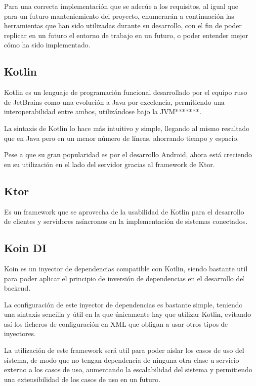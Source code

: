 Para una correcta implementación que se adecúe a los requisitos, al igual que para un futuro manteniemiento del proyecto, enumerarán a continuación las herramientas que han sido utilizadas durante su desarrollo, con el fin de poder replicar en un futuro el entorno de trabajo en un futuro, o poder entender mejor cómo ha sido implementado.

    \subsection{Kotlin}

Kotlin es un lenguaje de programación funcional desarrollado por el equipo ruso de JetBrains como una evolución a Java por excelencia, permitiendo una interoperabilidad entre ambos, utilizándose bajo la JVM*******.

La sintaxis de Kotlin lo hace más intuitivo y simple, llegando al mismo resultado que en Java pero en un menor número de líneas, ahorrando tiempo y espacio.

Pese a que su gran popularidad es por el desarrollo Android, ahora está creciendo en su utilización en el lado del servidor gracias al framework de Ktor. 

    \subsection{Ktor}

Es un framework que se aprovecha de la usabilidad de Kotlin para el desarrollo de clientes y servidores asíncronos en la implementación de sistemas conectados.

    \subsection{Koin DI}

Koin es un inyector de dependencias compatible con Kotlin, siendo bastante util para poder aplicar el principio de inversión de dependencias en el desarrollo del backend. 

La configuración de este inyector de dependencias es bastante simple, teniendo una sintaxis sencilla y útil en la que únicamente hay que utilizar Kotlin, evitando así los ficheros de configuración en XML que obligan a usar otros tipos de inyectores.

La utilización de este framework será util para poder aislar los casos de uso del sistema, de modo que no tengan dependencia de ninguna otra clase u servicio externo a los casos de uso, aumentando la escalabilidad del sistema y permitiendo una extensibilidad de los casos de uso en un futuro.

